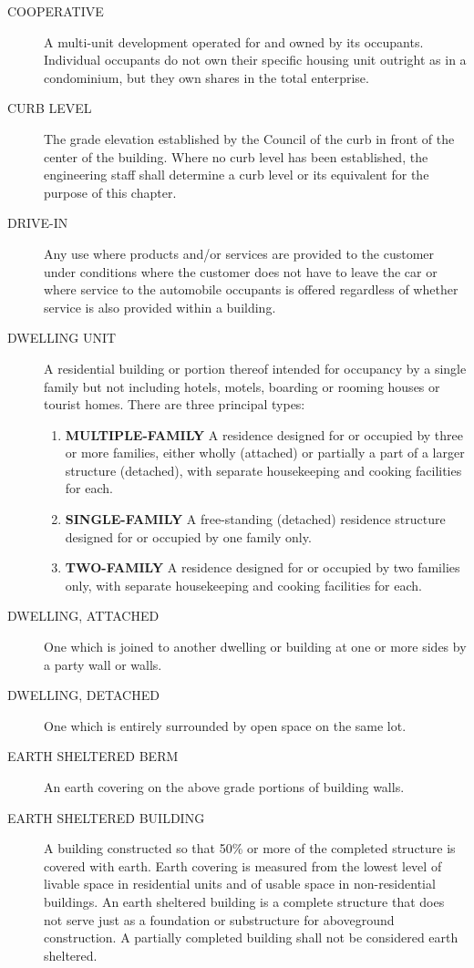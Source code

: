 \begin{description}
    \item[COOPERATIVE] A multi-unit development operated for and owned by its occupants.  Individual occupants do not own their specific housing unit outright as in a condominium, but they own shares in the total enterprise.
    \item[CURB LEVEL] The grade elevation established by the Council of the curb in front of the center of the building.  Where no curb level has been established, the engineering staff shall determine a curb level or its equivalent for the purpose of this chapter.
    \item[DRIVE-IN] Any use where products and/or services are provided to the customer under conditions where the customer does not have to leave the car or where service to the automobile occupants is offered regardless of whether service is also provided within a building.
    \item[DWELLING UNIT] A residential building or portion thereof intended for occupancy by a single family but not including hotels, motels, boarding or rooming houses or tourist homes.  There are three principal types:
        \begin{enumerate}
            \item \textbf{MULTIPLE-FAMILY} A residence designed for or occupied by three or more families, either wholly (attached) or partially a part of a larger structure (detached), with separate housekeeping and cooking facilities for each.
            \item \textbf{SINGLE-FAMILY} A free-standing (detached) residence structure designed for or occupied by one family only.
            \item \textbf{TWO-FAMILY} A residence designed for or occupied by two families only, with separate housekeeping and cooking facilities for each.
        \end{enumerate}
    \item[DWELLING, ATTACHED] One which is joined to another dwelling or building at one or more sides by a party wall or walls.
    \item[DWELLING, DETACHED] One which is entirely surrounded by open space on the same lot.
    \item[EARTH SHELTERED BERM] An earth covering on the above grade portions of building walls.
    \item[EARTH SHELTERED BUILDING] A building constructed so that 50\% or more of the completed structure is covered with earth.  Earth covering is measured from the lowest level of livable space in residential units and of usable space in non-residential buildings.  An earth sheltered building is a complete structure that does not serve just as a foundation or substructure for aboveground construction.  A partially completed building shall not be considered earth sheltered.

\end{description}
